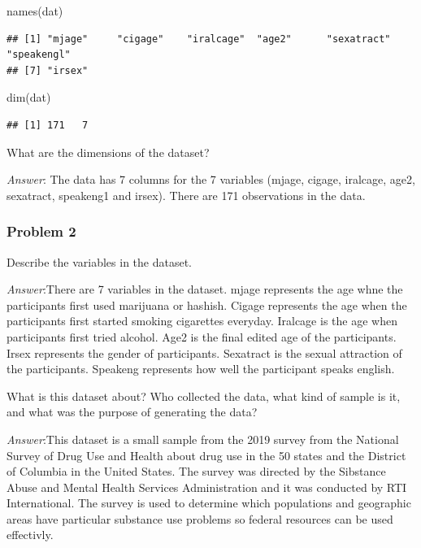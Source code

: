 \documentclass[
]{article}
\newenvironment{Shaded}{\begin{snugshade}}{\end{snugshade}}
\newcommand{\FunctionTok}[1]{\textcolor[rgb]{0.00,0.00,0.00}{#1}}
\newcommand{\NormalTok}[1]{#1}
\begin{document}
\begin{Shaded}
\begin{Highlighting}[]
\FunctionTok{names}\NormalTok{(dat)}
\end{Highlighting}
\end{Shaded}

\begin{verbatim}
## [1] "mjage"     "cigage"    "iralcage"  "age2"      "sexatract" "speakengl"
## [7] "irsex"
\end{verbatim}

\begin{Shaded}
\begin{Highlighting}[]
\FunctionTok{dim}\NormalTok{(dat)}
\end{Highlighting}
\end{Shaded}

\begin{verbatim}
## [1] 171   7
\end{verbatim}

What are the dimensions of the dataset?

\emph{Answer}: The data has 7 columns for the 7 variables (mjage,
cigage, iralcage, age2, sexatract, speakeng1 and irsex). There are 171
observations in the data.

\hypertarget{problem-2-1}{%
\subsubsection{Problem 2}\label{problem-2-1}}

Describe the variables in the dataset.

\emph{Answer}:There are 7 variables in the dataset. mjage represents the
age whne the participants first used marijuana or hashish. Cigage
represents the age when the participants first started smoking
cigarettes everyday. Iralcage is the age when participants first tried
alcohol. Age2 is the final edited age of the participants. Irsex
represents the gender of participants. Sexatract is the sexual
attraction of the participants. Speakeng represents how well the
participant speaks english.

What is this dataset about? Who collected the data, what kind of sample
is it, and what was the purpose of generating the data?

\emph{Answer}:This dataset is a small sample from the 2019 survey from
the National Survey of Drug Use and Health about drug use in the 50
states and the District of Columbia in the United States. The survey was
directed by the Sibstance Abuse and Mental Health Services
Administration and it was conducted by RTI International. The survey is
used to determine which populations and geographic areas have particular
substance use problems so federal resources can be used effectivly.
\end{document}
